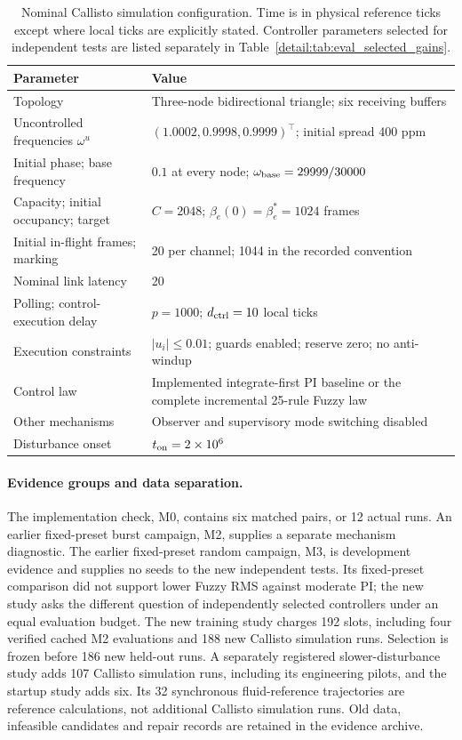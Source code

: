 \begin{table}[t]
\caption{Nominal Callisto simulation configuration. Time is in physical reference
ticks except where local ticks are explicitly stated. Controller parameters
selected for independent tests are listed separately in
Table~\ref{detail:tab:eval_selected_gains}.}
\label{detail:tab:eval_setup}
\centering
\begin{tabular}{@{}ll@{}}\toprule
Parameter & Value\\\midrule
Topology & Three-node bidirectional triangle; six receiving buffers\\
Uncontrolled frequencies $\omega^u$ & $(1.0002,0.9998,0.9999)^\top$; initial spread 400 ppm\\
Initial phase; base frequency & $0.1$ at every node; $\omega_{\rm base}=29999/30000$\\
Capacity; initial occupancy; target & $C=2048$; $\beta_e(0)=\beta_e^*=1024$ frames\\
Initial in-flight frames; marking & 20 per channel; 1044 in the recorded convention\\
Nominal link latency & 20\\
Polling; control-execution delay & $p=1000$; $d_{\rm ctrl}=10$ local ticks\\
Execution constraints & $|u_i|\le0.01$; guards enabled; reserve zero; no anti-windup\\
Control law & Implemented integrate-first PI baseline or the complete incremental 25-rule Fuzzy law\\
Other mechanisms & Observer and supervisory mode switching disabled\\
Disturbance onset & $t_{\rm on}=2\times10^6$\\\bottomrule
\end{tabular}
\end{table}

\paragraph{Evidence groups and data separation.}
The implementation check, M0, contains six matched pairs, or 12 actual
runs. An earlier fixed-preset burst campaign, M2, supplies a separate
mechanism diagnostic. The earlier fixed-preset random campaign, M3, is
development evidence and supplies no seeds to the new independent tests.
Its fixed-preset comparison did not support lower Fuzzy RMS against
moderate PI; the new study asks the different question of independently
selected controllers under an equal evaluation budget.
The new training study charges 192 slots, including four verified cached
M2 evaluations and 188 new Callisto simulation runs. Selection is frozen before 186
new held-out runs. A separately registered slower-disturbance study adds
107 Callisto simulation runs, including its engineering pilots, and the startup
study adds six. Its 32 synchronous fluid-reference trajectories are
reference calculations, not additional Callisto simulation runs. Old data, infeasible
candidates and repair records are retained in the evidence archive.

